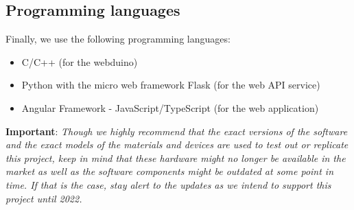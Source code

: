 \subsection{Programming languages}
Finally, we use the following programming languages:
\begin{itemize}
    \item C/C++ (for the webduino)
    \item Python with the micro web framework Flask (for the web API service)
    \item Angular Framework - JavaScript/TypeScript (for the web application)
\end{itemize}

\noindent
\textbf{Important}: \textit{Though we highly recommend that the exact versions of the software and the exact models of the materials and devices are used to test out or replicate this project, keep in mind that these hardware might no longer be available in the market as well as the software components might be outdated at some point in time. If that is the case, stay alert to the updates as we intend to support this project until 2022.}

